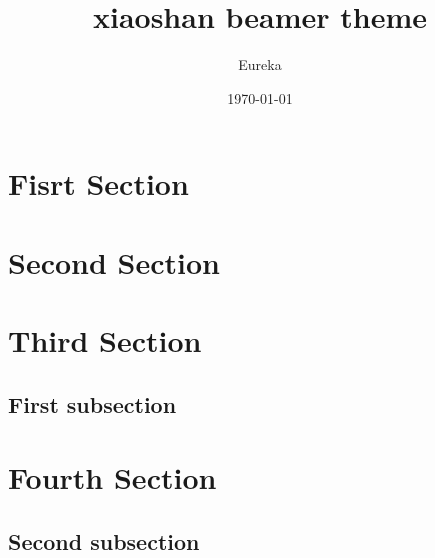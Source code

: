 \documentclass[layout={slide=true, theme=AnnArborSpruce}]{../code/ztex}
\title{xiaoshan beamer theme}
\author{Eureka}
\date{\today}
\begin{document}
\maketitle


\section{Fisrt Section}
\lipsum[1][1-3]

\section{Second Section}
\lipsum[1][1-3]

\section{Third Section}
\subsection{First subsection}
\lipsum[2][1-4]

\section{Fourth Section}
\lipsum[3][1-4]
\subsection{Second subsection}
\lipsum[3][1-4]
\end{document}
